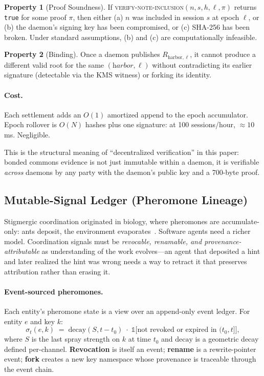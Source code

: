 \documentclass[11pt,a4paper]{article}
\theoremstyle{definition}
\newtheorem{property}{Property}[section]
\theoremstyle{remark}
\begin{document}
\begin{property}[Proof Soundness]\label{prop:proof-sound}
If \textsc{verify-note-inclusion}$(n,s,h,\ell,\pi)$ returns \texttt{true} for some proof $\pi$, then either (a) $n$ was included in session $s$ at epoch $\ell$, or (b) the daemon's signing key has been compromised, or (c) SHA-256 has been broken. Under standard assumptions, (b) and (c) are computationally infeasible.
\end{property}

\begin{property}[Binding]\label{prop:forest-bind}
Once a daemon publishes $R_{\text{harbor},\ell}$, it cannot produce a different valid root for the same $(\textit{harbor},\ell)$ without contradicting its earlier signature (detectable via the KMS witness) or forking its identity.
\end{property}

\paragraph{Cost.} Each settlement adds an $O(1)$ amortized append to the epoch accumulator. Epoch rollover is $O(N)$ hashes plus one signature: at 100 sessions/hour, $\approx 10$ms. Negligible.

This is the structural meaning of ``decentralized verification'' in this paper: bonded commons evidence is not just immutable within a daemon, it is verifiable \emph{across} daemons by any party with the daemon's public key and a 700-byte proof.

\subsection{Mutable-Signal Ledger (Pheromone Lineage)}\label{sec:pheromones}

Stigmergic coordination originated in biology, where pheromones are accumulate-only: ants deposit, the environment evaporates~\cite{theraulaz1999stigmergy}. Software agents need a richer model. Coordination signals must be \emph{revocable, renamable, and provenance-attributable} as understanding of the work evolves---an agent that deposited a hint and later realized the hint was wrong needs a way to retract it that preserves attribution rather than erasing it.

\paragraph{Event-sourced pheromones.} Each entity's pheromone state is a view over an append-only event ledger. For entity $e$ and key $k$:
\[
\sigma_t(e,k) \;=\; \mathrm{decay}(S, t - t_0)\;\cdot\;\mathbb{1}\bigl[\text{not revoked or expired in }(t_0, t]\bigr],
\]
where $S$ is the last spray strength on $k$ at time $t_0$ and $\mathrm{decay}$ is a geometric decay defined per-channel. \textbf{Revocation} is itself an event; \textbf{rename} is a rewrite-pointer event; \textbf{fork} creates a new key namespace whose provenance is traceable through the event chain.
\end{document}
